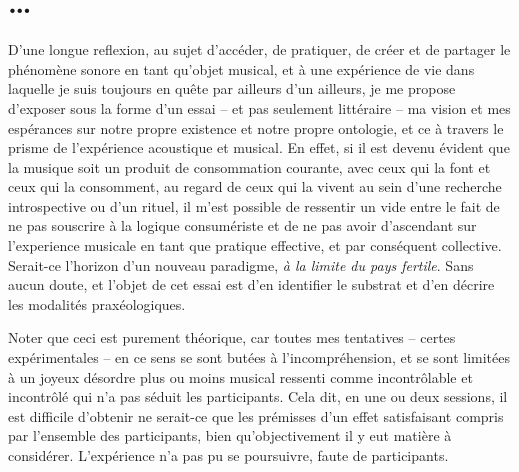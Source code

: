 \section*{…}
\label{one}
D'une longue reflexion, au sujet d'accéder, de pratiquer, de créer et de partager le phénomène sonore en tant qu'objet musical, et à une expérience de vie dans laquelle je suis toujours en quête par ailleurs d'un ailleurs, 
 je me propose d'exposer sous la forme d'un essai -- et pas seulement littéraire -- ma vision et mes espérances sur notre propre existence et notre propre ontologie, et ce à travers le prisme de l'expérience acoustique et musical. En effet, si il est devenu évident que la musique soit un produit de consommation courante, avec ceux qui la font et ceux qui la consomment, au regard de ceux qui la vivent au sein d'une recherche introspective ou d'un rituel,
il m'est possible de ressentir un vide entre le fait de ne pas souscrire à la logique consumériste et de ne pas avoir d'ascendant sur l'experience musicale en tant que pratique effective, et par conséquent collective.
Serait-ce l'horizon d'un nouveau paradigme, \textit{à la limite du pays fertile}. %
Sans aucun doute, et l'objet de cet essai est d'en identifier le substrat et d'en décrire les modalités praxéologiques.

\bigskip

Noter que ceci est purement théorique, car toutes mes tentatives -- certes expérimentales -- en ce sens se sont butées à l'incompréhension, et se sont limitées à un joyeux désordre plus ou moins musical ressenti comme incontrôlable et incontrôlé qui n'a pas séduit les participants. Cela dit, en une ou deux sessions, il est difficile d'obtenir ne serait-ce que les prémisses d'un effet satisfaisant compris par l'ensemble des participants, bien qu'objectivement il y eut matière à considérer. 
L'expérience n'a pas pu se poursuivre, faute de participants.

